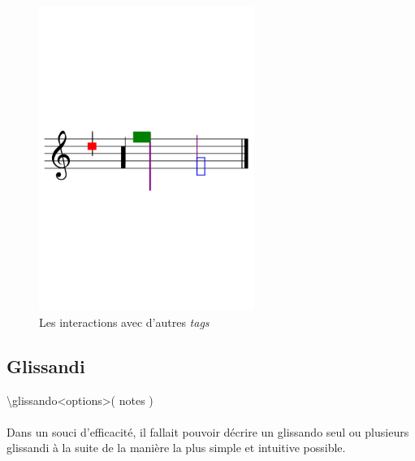 \documentclass[a4paper,10pt,twocolumn]{article}
\newenvironment{code}
  {\fontfamily{pnc}\selectfont}{}
\begin{document}
%
\begin{figure}[h]
\centering
\begin{code}
[
\textbackslash{}cluster\textless{}color="red", hdx=1, hdy=3\textgreater{}(\{a\})
\textbackslash{}cluster\textless{}size=0.5\textgreater{}(\{f,c2\})
\textbackslash{}noteFormat\textless{}color="purple"\textgreater{}
\textbackslash{}headsReverse
\textbackslash{}cluster\textless{}color="green", size=2\textgreater{}(\{f, g2\})
\textbackslash{}cluster\textless{}"blue"\textgreater{}(\{d1/2, g\})
]
\end{code}
\includegraphics[width=7cm]{img/partitions/clusterInteractions.pdf}
\caption{Les interactions avec d'autres \emph{tags}}
\label{fig:clusterInteractions}
\end{figure}
%


\subsection{Glissandi}

\begin{code}
\textbackslash{}glissando\textless{}options\textgreater{}( notes )
\end{code}
\\

\paragraph{}
Dans un souci d'efficacité, il fallait pouvoir décrire un glissando seul ou plusieurs glissandi à la suite de la manière la plus simple et intuitive possible. 
\end{document}
